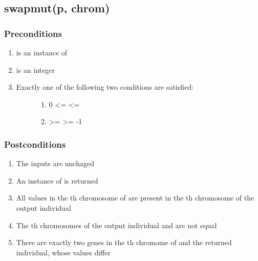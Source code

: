 \documentclass[letterpaper,10pt,english]{sphinxmanual}
\begin{document}
\subsection{swapmut(p, chrom)}
\label{contracts:swapmut-p-chrom}

\subsubsection{Preconditions}
\label{contracts:id41}\begin{enumerate}
\item {} 
 is an instance of 

\item {} 
 is an integer

\item {} \begin{description}
\item[{Exactly one of the following two conditions are satisfied:}] \leavevmode\begin{enumerate}
\item {} 
0 \textless{}=  \textless{}= 

\item {} 
 \textgreater{}=  \textgreater{}= -1

\end{enumerate}

\end{description}

\end{enumerate}


\subsubsection{Postconditions}
\label{contracts:id42}\begin{enumerate}
\item {} 
The inputs are unchaged

\item {} 
An instance of  is returned

\item {} 
All values in the  th chromosome of  are present in the  th chromosome of the output individual

\item {} 
The  th chromosomes of the output individual and  are not equal

\item {} 
There are exactly two genes in the  th chromome of  and the returned individual, whose values differ

\end{enumerate}
\end{document}
